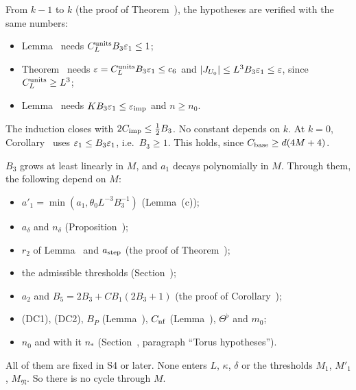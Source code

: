 \begin{detail}
\begin{step}
From $k-1$ to $k$ (the proof of Theorem~), the hypotheses are verified with the same numbers:
\begin{itemize}
\item Lemma~ needs $C^{\rm units}_LB_3\varepsilon_1\le1$;
\item Theorem~ needs $\varepsilon=C^{\rm units}_LB_3\varepsilon_1\le c_6$ and $|J_{U_0}|\le L^3B_3\varepsilon_1\le\varepsilon$, since $C^{\rm units}_L\ge L^3$;
\item Lemma~ needs $KB_3\varepsilon_1\le\varepsilon_{\rm imp}$ and $n\ge n_0$.
\end{itemize}
The induction closes with $2C_{\rm imp}\le\frac12B_3$. No constant depends on $k$. At $k=0$, Corollary~ uses $\varepsilon_1\le B_3\varepsilon_1$, i.e.\ $B_3\ge1$. This holds, since $C_{\rm base}\ge d(4M+4)$.
\end{step}

\begin{step}
$B_3$ grows at least linearly in $M$, and $a_1$ decays polynomially in $M$. Through them, the following depend on $M$:
\begin{itemize}
\item $a'_1=\min(a_1,\theta_0L^{-3}B_3^{-1})$ (Lemma~(c));
\item $a_\delta$ and $n_\delta$ (Proposition~);
\item $r_2$ of Lemma~ and $a_{\rm step}$ (the proof of Theorem~);
\item the admissible thresholds (Section~);
\item $a_2$ and $B_5=2B_3+CB_1(2B_3+1)$ (the proof of Corollary~);
\item (DC1), (DC2), $B_P$ (Lemma~), $C_{\rm nf}$ (Lemma~), $\Theta^\flat$ and $m_0$;
\item $n_0$ and with it $n_*$ (Section~, paragraph ``Torus hypotheses'').
\end{itemize}
All of them are fixed in S4 or later. None enters $L$, $\kappa$, $\delta$ or the thresholds $M_1$, $M'_1$, $M_{\mathfrak N}$. So there is no cycle through $M$.
\end{step}


\end{detail}
